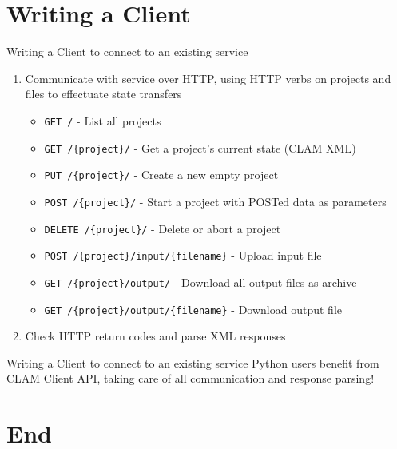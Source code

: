 \documentclass[compress]{beamer}
\begin{document}
\section{Writing a Client}

\begin{frame}
    \begin{block}{Writing a Client to connect to an existing service}
        \begin{enumerate}
            \item Communicate with service over HTTP, using HTTP verbs on projects and files to effectuate state transfers 
            {\footnotesize
            \begin{itemize}
                \item \texttt{GET /} - List all projects
                \item \texttt{GET /\{project\}/} - Get a project's current state (CLAM XML)
                \item \texttt{PUT /\{project\}/} - Create a new empty project
                \item \texttt{POST /\{project\}/} - Start a project with POSTed data as parameters
                \item \texttt{DELETE /\{project\}/} - Delete or abort a project
                \item \texttt{POST /\{project\}/input/\{filename\}} - Upload input file
                \item \texttt{GET /\{project\}/output/} - Download all output files as archive
                \item \texttt{GET /\{project\}/output/\{filename\}} - Download output file
            \end{itemize}
            }
            \item Check HTTP return codes and parse XML responses
        \end{enumerate}
    \end{block}

\end{frame}


\begin{frame}
    \begin{block}{Writing a Client to connect to an existing service}
        Python users benefit from CLAM Client API, taking care of all communication and response parsing!
    \end{block}

\end{frame}

\section{End}


\begin{frame}
    \raccoon
\end{frame}
\end{document}
